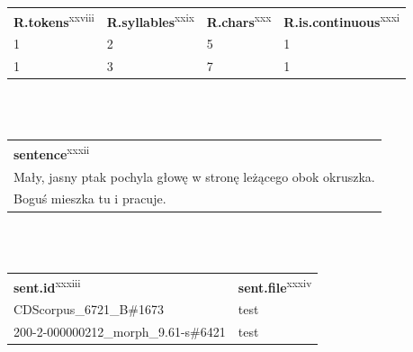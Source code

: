 \documentclass[licencjacka]{pracamgr_Kogni}
\begin{document}
    \hspace*{-0.7cm}\begin{tabular}[b]{|p{}|p{}|p{}|p{}|}
                        \hline
                        \rowcolor{lightgray}
                        \textbf{R.tokens}\textsuperscript{xxviii} & \textbf{R.syllables}\textsuperscript{xxix} & \textbf{R.chars}\textsuperscript{xxx} & \textbf{R.is.continuous}\textsuperscript{xxxi}\\
                        1                                         & 2                                          & 5                                     & 1                                              \\
                        1                                         & 3                                          & 7                                     & 1                                              \\
                        \hline
    \end{tabular}
    \\
    \\
    \hspace*{-0.7cm}\begin{tabular}[b]{|p{}|}
                        \hline
                        \rowcolor{lightgray}
                        \textbf{sentence}\textsuperscript{xxxii}                        \\
                        Mały, jasny ptak pochyla głowę w stronę leżącego obok okruszka. \\
                        Boguś mieszka tu i pracuje.                                     \\
                        \hline
    \end{tabular}
    \\
    \\
    \hspace*{-0.7cm}\begin{tabular}[b]{|p{}|p{}||}
                        \hline
                        \rowcolor{lightgray}
                        \textbf{sent.id}\textsuperscript{xxxiii} & \textbf{sent.file}\textsuperscript{xxxiv} \\
                        CDScorpus\_6721\_B\#1673                 & test                                      \\
                        200-2-000000212\_morph\_9.61-s\#6421     & test                                      \\
                        \hline
    \end{tabular}
    \\
    
\end{document}
